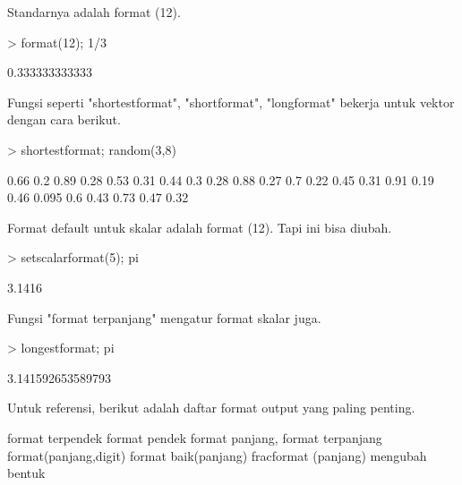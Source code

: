 \documentclass[a4paper,10pt]{article}
\begin{document}
\begin{eulernotebook}
\begin{eulercomment}
\begin{eulercomment}
\begin{eulercomment}
Standarnya adalah format (12).
\end{eulercomment}
\begin{eulerprompt}
> format(12); 1/3
\end{eulerprompt}
\begin{euleroutput}
  0.333333333333
\end{euleroutput}
\begin{eulercomment}
Fungsi seperti "shortestformat", "shortformat", "longformat" bekerja
untuk vektor dengan cara berikut.
\end{eulercomment}
\begin{eulerprompt}
> shortestformat; random(3,8)
\end{eulerprompt}
\begin{euleroutput}
    0.66    0.2   0.89   0.28   0.53   0.31   0.44    0.3 
    0.28   0.88   0.27    0.7   0.22   0.45   0.31   0.91 
    0.19   0.46  0.095    0.6   0.43   0.73   0.47   0.32 
\end{euleroutput}
\begin{eulercomment}
Format default untuk skalar adalah format (12). Tapi ini bisa diubah.
\end{eulercomment}
\begin{eulerprompt}
> setscalarformat(5); pi
\end{eulerprompt}
\begin{euleroutput}
  3.1416
\end{euleroutput}
\begin{eulercomment}
Fungsi "format terpanjang" mengatur format skalar juga.
\end{eulercomment}
\begin{eulerprompt}
> longestformat; pi
\end{eulerprompt}
\begin{euleroutput}
  3.141592653589793
\end{euleroutput}
\begin{eulercomment}
Untuk referensi, berikut adalah daftar format output yang paling
penting.

\end{eulercomment}
\begin{eulerttcomment}
 format terpendek format pendek format panjang, format terpanjang
 format(panjang,digit) format baik(panjang)
 fracformat (panjang)
 mengubah bentuk
\end{eulerttcomment}
\begin{eulercomment}


\end{eulercomment}
\end{eulercomment}
\end{eulercomment}
\end{eulernotebook}
\end{document}
